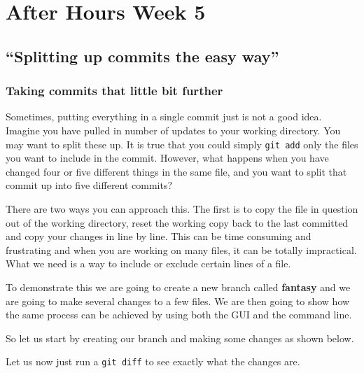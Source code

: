 \chapter{After Hours Week 5}
\section{``Splitting up commits the easy way''}
\subsection{Taking commits that little bit further}
Sometimes, putting everything in a single commit just is not a good idea.
Imagine you have pulled in number of updates to your working directory.
You may want to split these up.
It is true that you could simply \texttt{git add} only the files you want to include in the commit.
However, what happens when you have changed four or five different things in the same file, and you want to split that commit up into five different commits?

There are two ways you can approach this.
The first is to copy the file in question out of the working directory, reset the working copy back to the last committed and copy your changes in line by line.
This can be time consuming and frustrating and when you are working on many files, it can be totally impractical.
What we need is a way to include or exclude certain lines of a file.

To demonstrate this we are going to create a new branch called \textbf{fantasy} and we are going to make several changes to a few files.
We are then going to show how the same process can be achieved by using both the GUI and the command line.

So let us start by creating our branch and making some changes as shown below.


Let us now just run a \texttt{git diff} to see exactly what the changes are.

